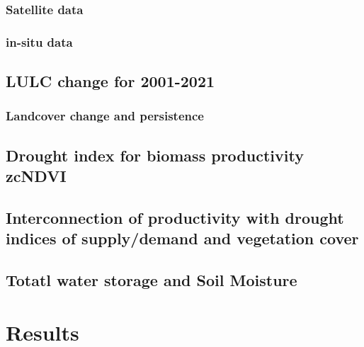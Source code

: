 \documentclass[preprint,
3p]{elsarticle} %
\begin{document}
\hypertarget{satellite-data}{%
\subsubsection{Satellite data}\label{satellite-data}}

\hypertarget{in-situ-data}{%
\subsubsection{in-situ data}\label{in-situ-data}}

\hypertarget{lulc-change-for-2001-2021}{%
\subsection{LULC change for 2001-2021}\label{lulc-change-for-2001-2021}}

\hypertarget{landcover-change-and-persistence}{%
\subsubsection{Landcover change and
persistence}\label{landcover-change-and-persistence}}

\hypertarget{drought-index-for-biomass-productivity-zcndvi}{%
\subsection{Drought index for biomass productivity
zcNDVI}\label{drought-index-for-biomass-productivity-zcndvi}}

\hypertarget{interconnection-of-productivity-with-drought-indices-of-supplydemand-and-vegetation-cover}{%
\subsection{Interconnection of productivity with drought indices of
supply/demand and vegetation
cover}\label{interconnection-of-productivity-with-drought-indices-of-supplydemand-and-vegetation-cover}}

\hypertarget{totatl-water-storage-and-soil-moisture}{%
\subsection{Totatl water storage and Soil
Moisture}\label{totatl-water-storage-and-soil-moisture}}

\hypertarget{results}{%
\section{Results}\label{results}}
\end{document}
